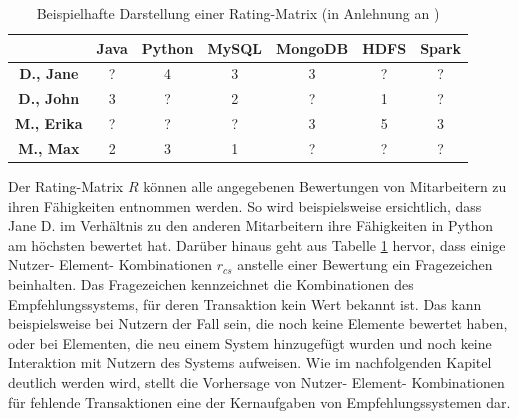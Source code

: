 \begin{table}[htbp]
    \begin{center}
    \begin{tabular}{c|c|c|c|c|c|c}
    {} & {\textbf{Java}} & {\textbf{Python}} & {\textbf{MySQL}} & {\textbf{MongoDB}} & {\textbf{HDFS}} & {\textbf{Spark}}\\
    \hline
    \textbf{D., Jane} & ? & 4 & 3 & 3 & ? & ?\\
    \hline
    \textbf{D., John} & 3 & ? & 2 & ? & 1 & ?\\
    \hline
    \textbf{M., Erika} & ? & ? & ? & 3 & 5 & 3\\
    \hline
    \textbf{M., Max} & 2 & 3 & 1 & ? & ? & ?\\
    \end{tabular}
    \end{center}
	\caption{Beispielhafte Darstellung einer Rating-Matrix (in Anlehnung an \cite{link:booklet})}
	\label{tab1}
\end{table}

Der Rating-Matrix $R$ können alle angegebenen Bewertungen von Mitarbeitern zu ihren Fähigkeiten entnommen werden.
So wird beispielsweise ersichtlich, dass Jane D. im Verhältnis zu den anderen Mitarbeitern ihre Fähigkeiten in Python am höchsten bewertet hat.
Darüber hinaus geht aus Tabelle \ref{tab1} hervor, dass einige Nutzer- Element- Kombinationen $r_{cs}$ anstelle einer Bewertung ein Fragezeichen beinhalten.
Das Fragezeichen kennzeichnet die Kombinationen des Empfehlungssystems, für deren Transaktion kein Wert bekannt ist.
Das kann beispielsweise bei Nutzern der Fall sein, die noch keine Elemente bewertet haben, oder bei Elementen, die neu einem System hinzugefügt wurden und noch keine Interaktion mit Nutzern des Systems aufweisen.
Wie im nachfolgenden Kapitel deutlich werden wird, stellt die Vorhersage von Nutzer- Element- Kombinationen für fehlende Transaktionen eine der Kernaufgaben von Empfehlungssystemen dar.

